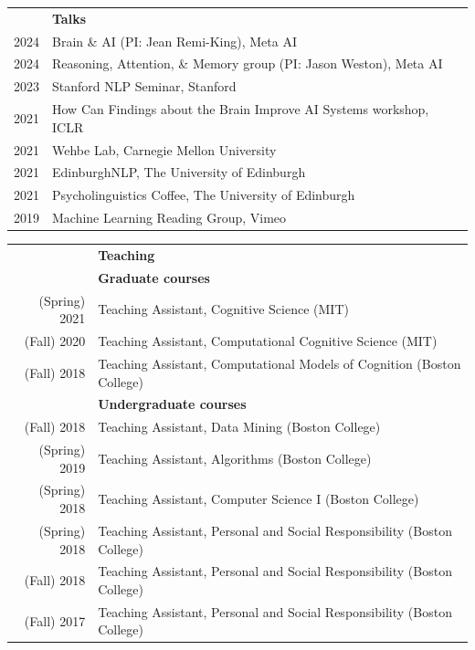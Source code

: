 \documentclass[letterpaper, 11pt]{article}
\newcommand{\headingfont}{\Large
\color{Black}}
\newcommand{\SectionHeading}[2][0pt]{ & {\headingfont\textbf{#2}}\\[#1] }
\newenvironment{SectionTableBase}[1]{%
\renewcommand{\arraystretch}{#1}%
\setlength{\tabcolsep}{10pt}%
\begin{longtable}{Rp{5.2in}} }{%
\end{longtable}
\vspace{-.3cm}
}
\newenvironment{SectionTableHalfSpace}{\begin{SectionTableBase}{0.9}}{\end{SectionTableBase}}
\begin{document}
\begin{SectionTableHalfSpace}
    \SectionHeading{Talks}

    2024 & Brain \& AI (PI: Jean Remi-King), Meta AI \\

    2024 & Reasoning, Attention, \& Memory group (PI: Jason Weston), Meta AI
    \\

    2023 & Stanford NLP Seminar, Stanford \\

    2021 & How Can Findings about the Brain Improve AI Systems workshop,
    ICLR\\

    2021 & Wehbe Lab, Carnegie Mellon University \\

    2021 & EdinburghNLP, The University of Edinburgh \\

    2021 & Psycholinguistics Coffee, The University of Edinburgh \\

    2019 & Machine Learning Reading Group, Vimeo \\
\end{SectionTableHalfSpace}

\begin{SectionTableHalfSpace}
    \SectionHeading{Teaching} & \textbf{Graduate courses} \\

    (Spring) 2021 & Teaching Assistant, Cognitive Science (MIT) \\

    (Fall) 2020 & Teaching Assistant, Computational Cognitive Science (MIT) \\

    (Fall) 2018 & Teaching Assistant, Computational Models of Cognition (Boston
    College) \\

    & \textbf{Undergraduate courses} \\

    (Fall) 2018 & Teaching Assistant, Data Mining (Boston College) \\

    (Spring) 2019 & Teaching Assistant, Algorithms (Boston College) \\

    (Spring) 2018 & Teaching Assistant, Computer Science I (Boston College) \\

    (Spring) 2018 & Teaching Assistant, Personal and Social Responsibility (Boston
    College) \\

    (Fall) 2018 & Teaching Assistant, Personal and Social Responsibility (Boston
    College) \\

    (Fall) 2017 & Teaching Assistant, Personal and Social Responsibility (Boston
    College)
\end{SectionTableHalfSpace}
\end{document}
